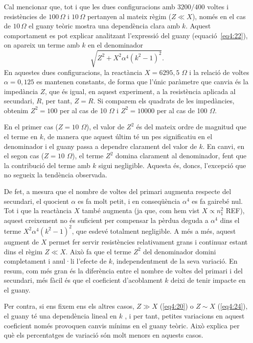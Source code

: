 \documentclass[a4paper,10.5pt]{report}
\begin{document}
Cal mencionar que, tot i que les dues configuracions amb $3200/400$ voltes i resistències de $100\,\Omega$ i $10\,\Omega$ pertanyen al mateix règim ($Z \ll X$), només en el cas de $10\,\Omega$ el guany teòric mostra una dependència clara amb $k$. Aquest comportament es pot explicar analitzant l’expressió del guany (equació~\ref{eq4:22}), on apareix un terme amb $k$ en el denominador
\begin{equation*}
	\sqrt{Z^2 + X^2 \alpha^4 (k^2 - 1)^2}.
\end{equation*}
En aquestes dues configuracions, la reactància $X = 6295,5$ $\Omega$ i la relació de voltes $\alpha = 0{,}125$ es mantenen constants, de forma que l’únic paràmetre que canvia és la impedància $Z$, que és igual, en aquest experiment, a la resistència aplicada al secundari, $R$, per tant, $Z =R $. Si comparem els quadrats de les impedàncies, obtenim $Z^2 = 100$ per al cas de 10 $\Omega$ i $Z^2 = 10000$ per al cas de 100 $\Omega$.

En el primer cas ($Z = 10$ $\Omega$), el valor de $Z^2$ és del mateix ordre de magnitud que el terme en $k$, de manera que aquest últim té un pes significatiu en el denominador i el guany passa a dependre clarament del valor de $k$. En canvi, en el segon cas ($Z=10$ $\Omega$), el terme $Z^2$ domina clarament al denominador, fent que la contribució del terme amb $k$ sigui negligible. Aquesta és, doncs, l’excepció que no segueix la tendència observada.

De fet, a mesura que el nombre de voltes del primari augmenta respecte del secundari, el quocient $\alpha$ es fa molt petit, i en conseqüència $\alpha^4$ es fa gairebé nul. Tot i que la reactància $X$ també augmenta (ja que, com hem vist $X \propto n_1^2$ REF), aquest creixement no és suficient per compensar la pèrdua deguda a $\alpha^4$ dins el terme $X^2 \alpha^4 (k^2 - 1)^2$, que esdevé totalment negligible. A més a més, aquest augment de $X$ permet fer servir resistències relativament grans i continuar estant dins el règim $Z \ll X$. Això fa que el terme $Z^2$ del denominador domini completament i anul·li l’efecte de $k$, independentment de la seva variació. En resum, com més gran és la diferència entre el nombre de voltes del primari i del secundari, més fàcil és que el coeficient d’acoblament $k$ deixi de tenir impacte en el guany.

Per contra, si ens fixem ens els altres casos, $Z \gg X$ (\ref{eq4:20}) o $Z \sim X$ (\ref{eq4:24}), el guany té una dependència lineal en $k$ , i per tant, petites variacions en aquest coeficient només provoquen canvis mínims en el guany teòric. Això explica per què els percentatges de variació són molt menors en aquests casos.
\end{document}
